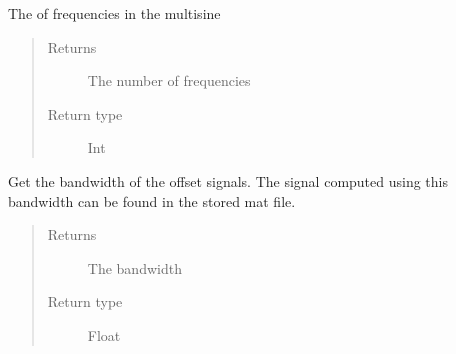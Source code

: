 \documentclass[letterpaper,10pt,english]{sphinxmanual}
\begin{document}
\begin{fulllineitems}
\begin{fulllineitems}
\end{fulllineitems}


\begin{fulllineitems}
\label{\detokenize{index:TiePieLCR_settings.TiePieLCR_settings.get_number_of_multisine_freqs}}
\sphinxAtStartPar
The of frequencies in the multisine
\begin{quote}\begin{description}
\item[{Returns}] \leavevmode
\sphinxAtStartPar
The number of frequencies

\item[{Return type}] \leavevmode
\sphinxAtStartPar
Int

\end{description}\end{quote}

\end{fulllineitems}


\begin{fulllineitems}
\label{\detokenize{index:TiePieLCR_settings.TiePieLCR_settings.get_offset_bandwidth}}
\sphinxAtStartPar
Get the bandwidth of the offset signals. The signal computed using this bandwidth can be found in the stored mat file\textasciigrave{}.
\begin{quote}\begin{description}
\item[{Returns}] \leavevmode
\sphinxAtStartPar
The bandwidth

\item[{Return type}] \leavevmode
\sphinxAtStartPar
Float

\end{description}\end{quote}

\end{fulllineitems}



\end{fulllineitems}
\end{document}

